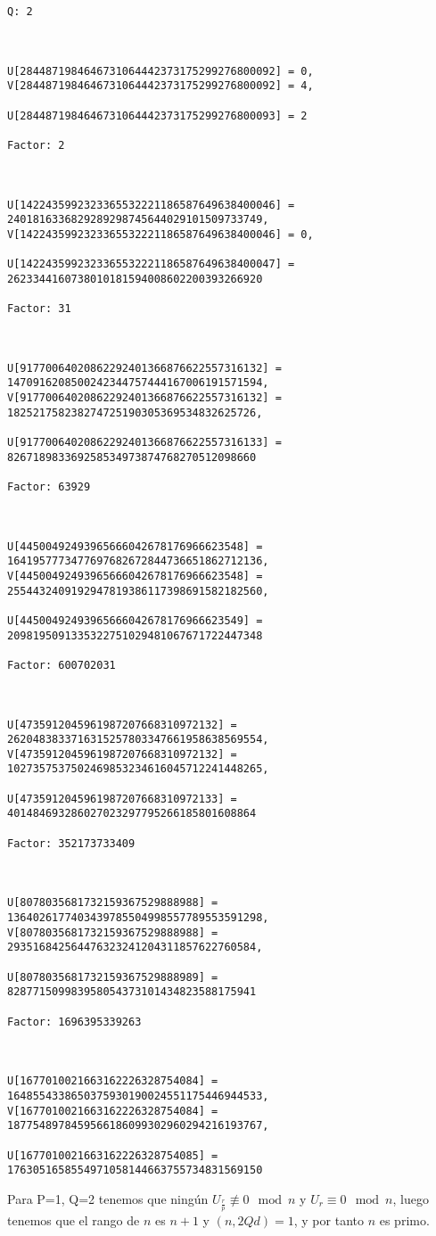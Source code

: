 \documentclass[a4paper]{article}
\begin{document}
\begin{verbatim}
Q: 2



U[2844871984646731064442373175299276800092] = 0, 
V[2844871984646731064442373175299276800092] = 4, 

U[2844871984646731064442373175299276800093] = 2

Factor: 2



U[1422435992323365532221186587649638400046] = 2401816336829289298745644029101509733749, 
V[1422435992323365532221186587649638400046] = 0, 

U[1422435992323365532221186587649638400047] = 2623344160738010181594008602200393266920

Factor: 31



U[91770064020862292401366876622557316132] = 1470916208500242344757444167006191571594, 
V[91770064020862292401366876622557316132] = 182521758238274725190305369534832625726, 

U[91770064020862292401366876622557316133] = 826718983369258534973874768270512098660

Factor: 63929



U[44500492493965666042678176966623548] = 1641957773477697682672844736651862712136, 
V[44500492493965666042678176966623548] = 2554432409192947819386117398691582182560, 

U[44500492493965666042678176966623549] = 2098195091335322751029481067671722447348

Factor: 600702031



U[4735912045961987207668310972132] = 2620483833716315257803347661958638569554, 
V[4735912045961987207668310972132] = 1027357537502469853234616045712241448265, 

U[4735912045961987207668310972133] = 401484693286027023297795266185801608864

Factor: 352173733409



U[8078035681732159367529888988] = 1364026177403439785504998557789553591298, 
V[8078035681732159367529888988] = 293516842564476323241204311857622760584, 

U[8078035681732159367529888989] = 828771509983958054373101434823588175941

Factor: 1696395339263



U[1677010021663162226328754084] = 1648554338650375930190024551175446944533, 
V[1677010021663162226328754084] = 1877548978459566186099302960294216193767, 

U[1677010021663162226328754085] = 1763051658554971058144663755734831569150
\end{verbatim}


Para P=1, Q=2 tenemos que ningún $U_{\frac{r}{p}}\not\equiv 0\mod n$ y $U_r\equiv 0\mod n$, luego tenemos que el rango de $n$ es $n+1$ y $(n,2Qd)=1$, y por tanto $n$ es primo.
\end{document}
